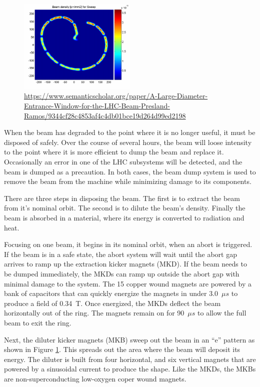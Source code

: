\begin{figure}[h!]
\captionsetup[subfigure]{position=b}
\centering
\includegraphics[width=0.5\textwidth]{figures/experiment/beamdump.png}
\caption{\url{https://www.semanticscholar.org/paper/A-Large-Diameter-Entrance-Window-for-the-LHC-Beam-Presland-Ramos/9344cf28c4853af4c4db01bce19d264d99ed2198}}
\label{fig:beamdump}
\end{figure}

When the beam has degraded to the point where it is no longer useful, it must be disposed of safely.
Over the course of several hours, the beam will loose intensity to the point where it is more efficient to dump the beam and replace it.
Occasionally an error in one of the LHC subsystems will be detected, and the beam is dumped as a precaution.
In both cases, the beam dump system is used to remove the beam from the machine while minimizing damage to its components.

There are three steps in disposing the beam. 
The first is to extract the beam from it's nominal orbit.
The second is to dilute the beam's density.
Finally the beam is absorbed in a material, where its energy is converted to radiation and heat. \cite{lhcDesignV1}

Focusing on one beam, it begins in its nominal orbit, when an abort is triggered. 
If the beam is in a safe state, the abort system will wait until the abort gap arrives to ramp up the extraction kicker magnets (MKD).
If the beam needs to be dumped immediately, the MKDs can ramp up outside the abort gap with minimal damage to the system.
The 15 copper wound magnets are powered by a bank of capacitors that can quickly energize the magnets in under 3.0~$\mu s$ to produce a field of 0.34~T. 
Once energized, the MKDs deflect the beam horizontally out of the ring.
The magnets remain on for 90~$\mu s$ to allow the full beam to exit the ring.

Next, the diluter kicker magnets (MKB) sweep out the beam in an ``e'' pattern as shown in Figure \ref{fig:beamdump}.
This spreads out the area where the beam will deposit its energy.
The diluter is built from four horizontal, and six vertical magnets that are powered by a sinusoidal current to produce the shape.
Like the MKDs, the MKBs are non-superconducting low-oxygen coper wound magnets.


